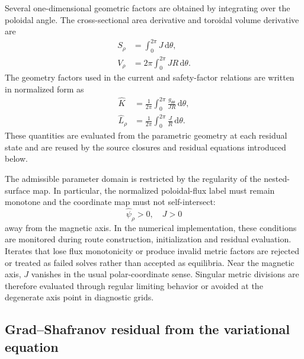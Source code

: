 \documentclass[final, 3p, times]{elsarticle}
\begin{document}
Several one-dimensional geometric factors are obtained by integrating over the poloidal angle. The cross-sectional area derivative and toroidal volume derivative are
\begin{align}
    S_\rho & = \int_0^{2\pi} J\,\mathrm{d}\theta,      \\
    V_\rho & = 2\pi\int_0^{2\pi} JR\,\mathrm{d}\theta.
\end{align}
The geometry factors used in the current and safety-factor relations are written in normalized form as
\begin{align}
    \hat{K}      & = \frac{1}{2\pi}\int_0^{2\pi}\frac{g_{\theta\theta}}{JR}\,\mathrm{d}\theta, \\
    \hat{L}_\rho & = \frac{1}{2\pi}\int_0^{2\pi}\frac{J}{R}\,\mathrm{d}\theta.
\end{align}
These quantities are evaluated from the parametric geometry at each residual state and are reused by the source closures and residual equations introduced below.

The admissible parameter domain is restricted by the regularity of the nested-surface map. In particular, the normalized poloidal-flux label must remain monotone and the coordinate map must not self-intersect:
\begin{equation}
    \hat{\psi}_\rho >0, \quad J>0
\end{equation}
away from the magnetic axis. In the numerical implementation, these conditions are monitored during route construction, initialization and residual evaluation. Iterates that lose flux monotonicity or produce invalid metric factors are rejected or treated as failed solves rather than accepted as equilibria. Near the magnetic axis, $J$ vanishes in the usual polar-coordinate sense. Singular metric divisions are therefore evaluated through regular limiting behavior or avoided at the degenerate axis point in diagnostic grids.

\subsection{Grad--Shafranov residual from the variational equation}
\end{document}
